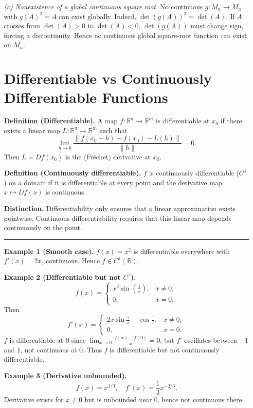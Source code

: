 \documentclass[12pt,a4paper]{article}
\theoremstyle{plain}
\theoremstyle{definition}
\theoremstyle{remark}
\theoremstyle{remark}
\newcommand{\sep}{\vspace{6pt}\hrule\vspace{8pt}}
\begin{document}
	\medskip
	
	\textit{(c) Nonexistence of a global continuous square root.}
	No continuous $g:M_n\to M_n$ with $g(A)^2=A$ can exist globally.
	Indeed, $\det(g(A))^2=\det(A)$.
	If $A$ crosses from $\det(A)>0$ to $\det(A)<0$, $\det(g(A))$ must change sign,
	forcing a discontinuity.
	Hence no continuous global square-root function can exist on $M_n$.
	
	\section*{Differentiable vs Continuously Differentiable Functions}
	
	\textbf{Definition (Differentiable).}
	A map $f:\mathbb{R}^n\to\mathbb{R}^m$ is differentiable at $x_0$ if there exists a linear map
	$L:\mathbb{R}^n\to\mathbb{R}^m$ such that
	\[
	\lim_{h\to0}\frac{\|f(x_0+h)-f(x_0)-L(h)\|}{\|h\|}=0.
	\]
	Then $L=Df(x_0)$ is the (Fréchet) derivative at $x_0$.
	
	\textbf{Definition (Continuously differentiable).}
	$f$ is continuously differentiable ($C^1$) on a domain if it is differentiable at every point
	and the derivative map $x\mapsto Df(x)$ is continuous.
	
	\textbf{Distinction.}
	Differentiability only ensures that a linear approximation exists pointwise.
	Continuous differentiability requires that this linear map depends continuously on the point.
	
	\sep
	
	\textbf{Example 1 (Smooth case).}
	$f(x)=x^2$ is differentiable everywhere with $f'(x)=2x$, continuous.
	Hence $f\in C^1(\mathbb{R})$.
	
	\textbf{Example 2 (Differentiable but not $C^1$).}
	\[
	f(x)=
	\begin{cases}
		x^2\sin\!\left(\tfrac{1}{x}\right), & x\ne0,\\
		0,& x=0.
	\end{cases}
	\]
	Then
	\[
	f'(x)=
	\begin{cases}
		2x\sin\!\frac{1}{x}-\cos\!\frac{1}{x}, & x\ne0,\\
		0,& x=0.
	\end{cases}
	\]
	$f$ is differentiable at $0$ since
	$\displaystyle\lim_{x\to0}\frac{f(x)-f(0)}{x}=0$,
	but $f'$ oscillates between $-1$ and $1$, not continuous at $0$.
	Thus $f$ is differentiable but not continuously differentiable.
	
	\textbf{Example 3 (Derivative unbounded).}
	\[
	f(x)=x^{1/3},\quad f'(x)=\frac{1}{3}x^{-2/3}.
	\]
	Derivative exists for $x\ne0$ but is unbounded near $0$, hence not continuous there.
	
\end{document}
